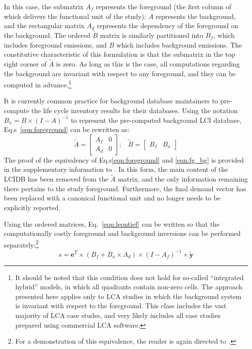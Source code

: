 {
In this case, the submatrix $A_f$ represents the foreground (the first column of which delivers the functional unit of the study); $A$ represents the background, and the rectangular matrix $A_d$ represents the dependency of the foreground on the background.  The ordered $\tilde{B}$ matrix is similarly partitioned into $B_f$, which includes foreground emissions, and $B$ which includes background emissions. The constitutive characteristic of this formulation is that the submatrix in the top right corner of $\tilde{A}$ is zero.  As long as this is the case, all computations regarding the background are invariant with respect to any foreground, and they can be computed in advance.\footnote{It should be noted that this condition does not hold for so-called ``integrated hybrid'' models, in which all quadrants contain non-zero cells.  The approach presented here applies only to LCA studies in which the background system is invariant with respect to the foreground. This class includes the vast majority of LCA case studes, and very likely includes all case studies prepared using commercial LCA software.}

It is currently common practice for background database maintainers to pre-compute the life cycle inventory results for their databases.  Using the notation $B_x = B \times (I - A)^{-1}$ to represent the pre-computed background LCI database, Eq.s~\ref{eqn:foreground} can be rewritten as:
\begin{equation}
 \tilde{A} = \left[\begin{array}{cc} 
A_f &  0 \\
A_d & 0 
   \end{array}\right];\;\;\;  \tilde{B} = \left[\begin{array}{cc} B_f & B_x \end{array}\right ]
\label{eqn:fg_bg}
\end{equation}
The proof of the equivalency of Eq.s\ref{eqn:foreground} and \ref{eqn:fg_bg} is provided in the supplementary information to \cite{Kuczenski_JLCA_2015}.  In this form, the main content of the LCIDB has been removed from the $\tilde{A}$ matrix, and the only information remaining there pertains to the study foreground.  Furthermore, the final demand vector has been replaced with a canonical functional unit and no longer needs to be explicitly reported.

Using the ordered matrices, Eq.~\ref{eqn:leontief} can be written so that the computationally costly foreground and background inversions can be performed separately:\footnote{For a demonstration of this equivalence, the reader is again directed to \cite{Kuczenski_JLCA_2015}.}
\begin{equation}
s = \mathbf{e}^T \times (B_f + B_x\times A_d) \times (I - A_f)^{-1} \times \tilde{\mathbf{y}}
\label{eqn:study}
\end{equation}

}
